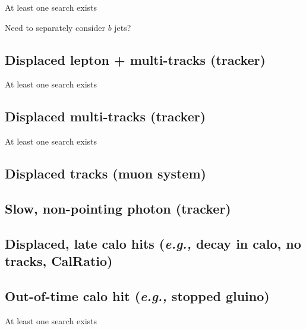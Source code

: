 At least one search exists

Need to separately consider $b$ jets?


\subsection{Displaced lepton + multi-tracks (tracker)}

At least one search exists

\subsection{Displaced multi-tracks (tracker)}

At least one search exists

\subsection{Displaced tracks (muon system)}

\subsection{Slow, non-pointing photon (tracker)}

\subsection{Displaced, late calo hits (\emph{e.g.,} decay in calo, no tracks, CalRatio)}

\subsection{Out-of-time calo hit (\emph{e.g.,} stopped gluino)}

At least one search exists
